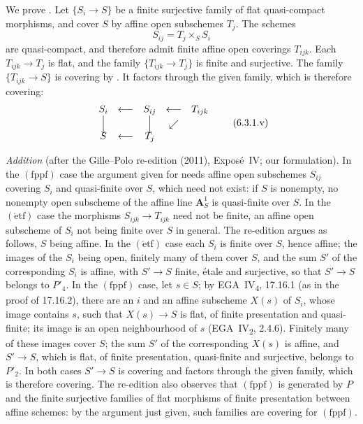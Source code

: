 We prove . Let \(\{S_i\to S\}\) be a finite surjective family of flat
quasi-compact morphisms, and cover \(S\) by affine open subschemes \(T_j\).
The schemes
\[
  S_{ij}=T_j\times_SS_i
\]
are quasi-compact, and therefore admit finite affine open coverings
\(T_{ijk}\). Each \(T_{ijk}\to T_j\) is flat, and the family
\(\{T_{ijk}\to T_j\}\) is finite and surjective. The family
\(\{T_{ijk}\to S\}\) is covering by . It factors
through the given family, which is therefore covering:
\[
\begin{array}{ccccc}
  S_i & \longleftarrow & S_{ij} & \longleftarrow & T_{ijk}\\
  \Big\downarrow & & \Big\downarrow & \swarrow &\\[-0.25em]
  S & \longleftarrow & T_j & &
\end{array}
\tag{6.3.1.v}\label{sga3:iv:proposition:6:3:1:eq:6:3:1:v:01}
\]

\par\medskip\noindent
\emph{Addition} (after the Gille--Polo re-edition (2011), Expos\'e~IV; our
formulation).  In the \((\mathrm{fppf})\) case the
argument given for  needs affine open subschemes \(S_{ij}\) covering \(S_i\)
and quasi-finite over \(S\), which need not exist: if \(S\) is nonempty, no
nonempty open subscheme of the affine line \(\mathbf A^1_S\) is quasi-finite
over \(S\). In the \((\mathrm{\acute etf})\) case the morphisms
\(S_{ijk}\to T_{ijk}\) need not be finite, an affine open subscheme of \(S_i\)
not being finite over \(S\) in general. The re-edition argues as follows,
\(S\) being affine. In the \((\mathrm{\acute etf})\) case each \(S_i\) is
finite over \(S\), hence affine; the images of the \(S_i\) being open,
finitely many of them cover \(S\), and the sum \(S'\) of the corresponding
\(S_i\) is affine, with \(S'\to S\) finite, \'etale and surjective, so that
\(S'\to S\) belongs to \(P'_4\). In the \((\mathrm{fppf})\) case, let
\(s\in S\); by EGA~IV\textsubscript{4}, 17.16.1 (as in the proof of 17.16.2),
there are an \(i\) and an affine subscheme \(X(s)\) of \(S_i\), whose image
contains \(s\), such that \(X(s)\to S\) is flat, of finite presentation and
quasi-finite; its image is an open neighbourhood of \(s\)
(EGA~IV\textsubscript{2}, 2.4.6). Finitely many of these images cover \(S\);
the sum \(S'\) of the corresponding \(X(s)\) is affine, and \(S'\to S\), which
is flat, of finite presentation, quasi-finite and surjective, belongs to
\(P'_2\). In both cases \(S'\to S\) is covering and factors through the given
family, which is therefore covering. The re-edition also observes that
\((\mathrm{fppf})\) is generated by \(P\) and the finite surjective families
of flat morphisms of finite presentation between affine schemes: by the
argument just given, such families are covering for \((\mathrm{fppf})\).
\par\medskip

